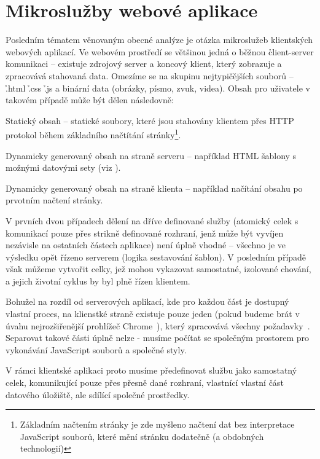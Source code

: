 
\section{Mikroslužby webové aplikace}\label{sec:msa-client}

Posledním tématem věnovaným obecné analýze  je otázka mikroslužeb klientských webových aplikací.
Ve webovém prostředí se většinou jedná o běžnou \h{client-server} komunikaci – existuje zdrojový server a koncový klient, který zobrazuje a zpracovává stahovaná data.
Omezíme se na skupinu nejtypičějších souborů – \h{.html} \h{.css} \h{.js} a binární data (obrázky, písmo, zvuk, videa).
Obsah pro uživatele v takovém případě může být dělen následovně:

\begin{dl}
   \item[Statický obsah] – statické soubory, které jsou stahovány klientem přes HTTP protokol během základního načtítání stránky\footnote{Základním načtením stránky je zde myšleno načtení dat bez interpretace JavaScript souborů, které mění stránku dodatečně (a obdobných technologií)}.
   \item[Dynamicky generovaný obsah na straně serveru] – například HTML šablony s možnými datovými sety (viz ).
   \item[Dynamicky generovaný obsah na straně klienta] – například  načítání obsahu po prvotním načtení stránky.
\end{dl}

V prvních dvou případech dělení na dříve definované služby (atomický celek s komunikací pouze přes strikně definované rozhraní, jenž může být vyvíjen nezávisle na ostatních částech aplikace) není úplně vhodné – všechno je ve výsledku opět řízeno serverem (logika sestavování šablon).
V posledním případě však můžeme vytvořit celky, jež mohou vykazovat samostatné, izolované chování, a jejich životní cyklus by byl plně řízen klientem.

Bohužel na rozdíl od serverových aplikací, kde pro každou část je dostupný vlastní proces, na klienstké straně existuje pouze jeden (pokud budeme brát v úvahu nejrozšiřenější prohlížeč Chrome~\cite{browserstats}), který zpracovává všechny požadavky~\cite{chromiumprocesses}.
Separovat takové části úplně nelze - musíme počítat se společným prostorem pro vykonávání JavaScript souborů a společné  styly.

V rámci klientské aplikaci proto musíme předefinovat službu jako samostatný celek, komunikující pouze přes přesně dané rozhraní, vlastnící vlastní část datového úložiště, ale sdílící společné prostředky.

